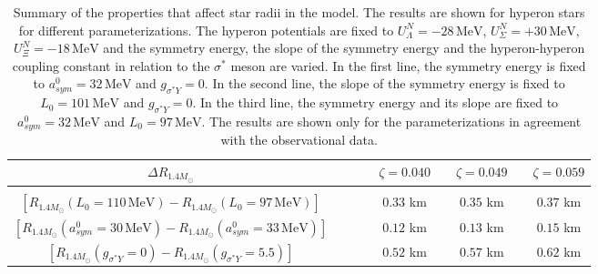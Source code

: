 \documentclass[twocolumn,showpacs,aps]{revtex4}
\begin{document}

 
 \begin{table}[t]
  \centering
  \begin{tabular}{*{9}{c}}
    \hline  \hline
\bfseries  $\Delta R_{1.4M_{\odot}}$ & & &  &  $\zeta=0.040$&  &  $\zeta=0.049$&  &  $\zeta=0.059$ \\
    \hline 
    & & & & & & & &\\
$[R_{1.4M_{\odot}}(L_0=110\,\mathrm{MeV})-R_{1.4M_{\odot}}(L_0=97\,\mathrm{MeV})]$ &  &  &  &  $0.33$ km  &  & $0.35$ km  &  &  $0.37$ km    \\                    
$[R_{1.4M_{\odot}}(a_{sym}^0=30\,\mathrm{MeV})-R_{1.4M_{\odot}}(a_{sym}^0=33\,\mathrm{MeV})]$ &  &  &  &  $0.12$ km  &  &  $0.13$ km  &  &  $0.15$ km \\
$[R_{1.4M_{\odot}}(g_{\sigma^* Y}=0)-R_{1.4M_{\odot}}(g_{\sigma^* Y}=5.5)]$ &  &  &  &  $0.52$ km  &   & $0.57$ km  &  &  $0.62$ km \\  
    \hline \hline
  \end{tabular}
\caption{ Summary of the properties that affect star radii in the model. The results are shown for hyperon stars
for different parameterizations. The hyperon potentials are fixed to $U_{\Lambda}^N=-28 \,\mathrm{MeV}$, $U_{\Sigma}^N=+30 \,\mathrm{MeV}$, $U_{\Xi}^N=-18 \,\mathrm{MeV}$ 
and the symmetry energy, the slope of the symmetry energy and the hyperon-hyperon coupling constant in relation to the $\sigma^*$ meson are varied.
In the first line, the symmetry energy  is fixed to $a_{sym}^0=32 \,\mathrm{MeV}$ and $g_{\sigma^* Y}=0$. 
In the second line, the slope of the symmetry energy is fixed to $L_{0}=101 \,\mathrm{MeV}$ and $g_{\sigma^* Y}=0$.
In the third line, the symmetry energy and its slope are fixed to $a_{sym}^0=32 \,\mathrm{MeV}$ and $L_{0}=97 \,\mathrm{MeV}$. 
The results are shown only for the parameterizations in agreement with the observational data.} \label{tab_radius}
\end{table}
\end{document}
